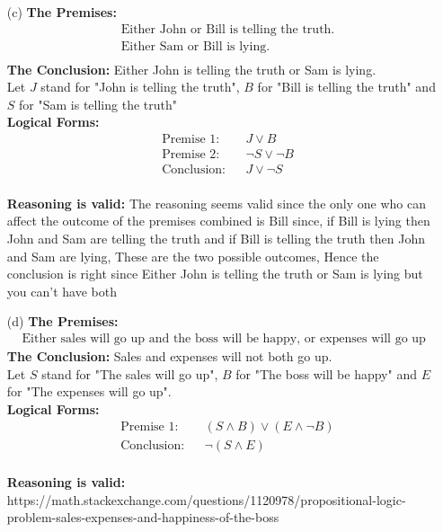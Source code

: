 \documentclass{article} %
\begin{document}
\begin{enumerate}
\begin{itemize}
            \item[(c)] \textbf{The Premises:}
            \begin{align*}
                &\text{Either John or Bill is telling the truth.} \\
                &\text{Either Sam or Bill is lying.} \\
            \end{align*}
            \textbf{The Conclusion:} Either John is telling the truth or Sam is lying. \\
            Let \(J\) stand for "John is telling the truth", \(B\) for "Bill is telling the truth" and \(S\) for "Sam is telling the truth" \\
            \textbf{Logical Forms:}
            \begin{align*}
                &\text{Premise 1:} && J \vee B \\
                &\text{Premise 2:} && \neg S \vee \neg B \\
                &\text{Conclusion:} && J \vee \neg S 
            \end{align*} \\
            \textbf{Reasoning is valid:} The reasoning seems valid since the only one who can affect the outcome of the premises combined is Bill since, if Bill is lying then John and Sam are telling the truth and if Bill is telling the truth then John and Sam are lying, These are the two possible outcomes, Hence the conclusion is right since Either John is telling the truth or Sam is lying but you can't have both

            \item[(d)] \textbf{The Premises:}
            \begin{align*}
                &\text{Either sales will go up and the boss will be happy, or expenses will go up and the boss won't be happy.}
            \end{align*}
            \textbf{The Conclusion:} Sales and expenses will not both go up. \\
            Let \(S\) stand for "The sales will go up", \(B\) for "The boss will be happy" and \(E\) for "The expenses will go up". \\
            \textbf{Logical Forms:}
            \begin{align*}
                &\text{Premise 1:} && (S \wedge B) \vee (E \wedge \neg B) \\
                &\text{Conclusion:} && \neg (S \wedge E) 
            \end{align*} \\
            \textbf{Reasoning is valid:} https://math.stackexchange.com/questions/1120978/propositional-logic-problem-sales-expenses-and-happiness-of-the-boss

        \end{itemize}

    \end{enumerate}
\end{document}

